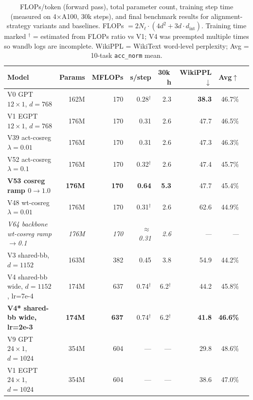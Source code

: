 \begin{table}[h]
\centering
\caption{%
  FLOPs/token (forward pass), total parameter count, training step time
  (measured on 4$\times$A100, 30k steps), and final benchmark results for
  alignment-strategy variants and baselines.
  FLOPs $= 2 N_\ell \cdot (4d^2 + 3d \cdot d_{\text{int}})$.
  Training time marked $^\dagger$ = estimated from FLOPs ratio vs V1;
  V4 was preempted multiple times so wandb logs are incomplete.
  WikiPPL = WikiText word-level perplexity; Avg = 10-task \texttt{acc\_norm} mean.
}
\label{tab:alignment_flops}
\small
\begin{tabular}{lrrrrrrr}
\toprule
\textbf{Model} & \textbf{Params} & \textbf{MFLOPs} & \textbf{s/step} & \textbf{30k$\,$h} & \textbf{WikiPPL$\downarrow$} & \textbf{Avg$\uparrow$} \\
\midrule
V0  GPT $12{\times}1$, $d{=}768$         & 162M & 170  & 0.28$^\dagger$ & 2.3 & \textbf{38.3} & 46.7\% \\
V1  EGPT $12{\times}1$, $d{=}768$        & 176M & 170  & 0.31           & 2.6 & 47.7          & 46.5\% \\
\midrule
V39 act-cosreg $\lambda{=}0.01$           & 176M & 170  & 0.31           & 2.6 & 47.3          & 46.3\% \\
V52 act-cosreg $\lambda{=}0.1$            & 176M & 170  & 0.32$^\dagger$ & 2.6 & 47.4          & 45.7\% \\
\textbf{V53 cosreg ramp $0{\to}1.0$}      & \textbf{176M} & \textbf{170} & \textbf{0.64} & \textbf{5.3} & 47.7 & 45.4\% \\
V48 wt-cosreg $\lambda{=}0.01$            & 176M & 170  & 0.31$^\dagger$ & 2.6 & 62.6          & 44.9\% \\
\textit{V64 backbone wt-cosreg ramp${\to}$0.1} & \textit{176M} & \textit{170} & \textit{$\approx$0.31} & \textit{2.6} & \textit{---} & \textit{---} \\
\midrule
V3  shared-bb, $d{=}1152$                 & 163M & 382  & 0.45           & 3.8 & 54.9          & 44.2\% \\
V4  shared-bb wide, $d{=}1152$, lr=7e-4  & 174M & 637  & 0.74$^\dagger$ & 6.2$^\dagger$ & 44.2 & 45.8\% \\
\textbf{V4* shared-bb wide, lr=2e-3}      & \textbf{174M} & \textbf{637} & 0.74$^\dagger$ & 6.2$^\dagger$ & \textbf{41.8} & \textbf{46.6\%} \\
\midrule
V9  GPT $24{\times}1$, $d{=}1024$         & 354M & 604  & ---            & --- & 29.8 & 48.6\% \\
V1  EGPT $24{\times}1$, $d{=}1024$        & 354M & 604  & ---            & --- & 38.6 & 47.0\% \\
\bottomrule
\end{tabular}
\end{table}

